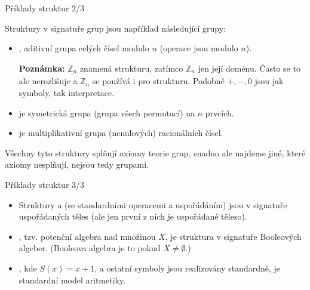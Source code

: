 \documentclass{beamer}
\begin{document}
\begin{frame}{Příklady struktur 2/3}
    
    Struktury \alert{v signatuře grup} jsou například následující \alert{grupy}:
        \begin{itemize}
            \item {}, \alert{aditivní grupa celých čísel modulo $n$} (operace jsou modulo $n$). 
            
            \smallskip
            
            \textbf{Poznámka:} $\underline{\mathbb Z_n}$ znamená strukturu, zatímco $\mathbb Z_n$ jen její doménu. Často se to ale nerozlišuje a $\mathbb Z_n$ se používá i pro strukturu. Podobně $+,-,0$ jsou jak symboly, tak interpretace.

            \smallskip

            \item {} je \alert{symetrická grupa} (grupa všech permutací) na $n$ prvcích.
            \item {} je \alert{multiplikativní grupa (nenulových) racionálních čísel}. 
        \end{itemize}
        Všechny tyto struktury \alert{splňují axiomy teorie grup}, snadno ale najdeme jiné, které axiomy nesplňují, nejsou tedy grupami.
    

\end{frame}


\begin{frame}{Příklady struktur 3/3}
    
    \begin{itemize}
        \item Struktury a (se standardními operacemi a uspořádáním) jsou \alert{v signatuře uspořádaných těles} (ale jen první z nich je uspořádané těleso).
        \item {}, tzv. \alert{potenční algebra} nad množinou $X$, je struktura \alert{v signatuře Booleových algeber}. (\alert{Booleova algebra} je to pokud $X\neq\emptyset$.)
        \item {}, kde $S(x)=x+1$, a ostatní symboly jsou realizovány standardně, je \alert{standardní model aritmetiky}.
    \end{itemize}

\end{frame}
\end{document}
